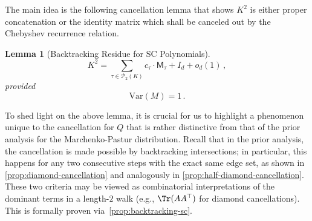 \documentclass[12pt]{article}
\newcommand{\Var}{\mathrm{Var}}
\newtheorem{lemma}[theorem]{Lemma}
\newcommand{\calP}{\mathcal{P}}
\newcommand{\cm}{\mathsf{M} }
\begin{document}
The main idea is the following cancellation lemma that shows $K^2$ is either proper concatenation or the identity matrix which shall be canceled out by the Chebyshev recurrence relation.
\begin{lemma}[Backtracking Residue for SC Polynomials]  
\[ 
 K^2 = \sum_{\tau \in \calP_2(K) } c_\tau \cdot \cm_\tau + I_d + o_d(1)\,, 
\]
provided \[ 
\Var(M) = 1\,.
\]
\end{lemma}

To shed light on the above lemma, it is crucial for us to highlight a phenomenon unique to the cancellation for $Q$ that is rather distinctive from that of the prior analysis for the Marchenko-Pastur distribution. Recall that in the prior analysis, the cancellation is made possible by backtracking intersections; in particular, this happens for any two consecutive steps with the exact same edge set, as shown in \cref{prop:diamond-cancellation} and analogously in \cref{prop:half-diamond-cancellation}. These two criteria may be viewed as combinatorial interpretations of the dominant terms in a length-$2$ walk (e.g., $\Tr(AA^\top )$ for diamond cancellations). This is formally proven via~\cref{prop:backtracking-sc}.





\end{document}
